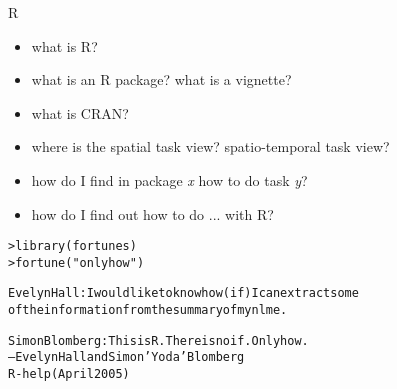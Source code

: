 \documentclass{beamer}
\begin{document}
\begin{frame}{R}
\begin{itemize}
\item what is R?
\item what is an R package? what is a vignette?
\item what is CRAN?
\item where is the spatial task view? spatio-temporal task view?
\item how do I find in package {\em x} how to do task {\em y}?
\item how do I find out how to do ... with R?
\end{itemize} \pause
\begin{alltt}
\begin{small}
> library(fortunes)
> fortune("only how")

Evelyn Hall: I would like to know how (if) I can extract some 
of the information from the summary of my nlme.

Simon Blomberg: This is R. There is no if. Only how.
   -- Evelyn Hall and Simon 'Yoda' Blomberg
      R-help (April 2005)
\end{small}
\end{alltt}
\end{frame}
\end{document}
